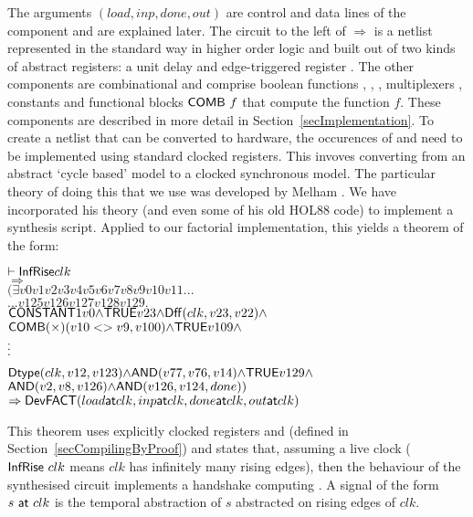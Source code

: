 \vspace*{-2mm}

The arguments $(load,inp,done,out)$ are control and data lines of the component
and are explained later. The circuit to the left of $\Rightarrow$ is a netlist represented in
the standard way in higher order logic \cite{Mel93} and built out of
two kinds of abstract registers: a unit delay  and
edge-triggered register . The other components are
combinational and comprise boolean functions ,
, , multiplexers , constants
and functional blocks
$\mathsf{COMB}~f$ that compute the function $f$. These components are
described in more detail in Section~\ref{secImplementation}. To
create a netlist that can be converted to hardware, the occurences of
 and  need to be implemented using standard
clocked registers. This invoves converting from an abstract `cycle
based' model to a clocked synchronous model. The particular theory of doing this that we use
was developed by Melham \cite{Mel93}. We have incorporated
his theory (and even some of his old HOL88 code) to
implement a synthesis script. Applied to our factorial implementation, this yields
a theorem of the form:

\vspace*{-1mm}

{\baselineskip10pt\begin{alltt}
\( \vdash \DEF{InfRise} clk                                                                        \)
\(   \Rightarrow                                                                                   \)
\(   ({\exists}v0 v1 v2 v3 v4 v5 v6 v7 v8 v9 v10 v11 ...                               \)
\(     ... v125 v126 v127 v128 v129.                                                                   \)
\(     \DEF{CONSTANT} 1 v0 {\wedge} \DEF{TRUE} v23 {\wedge} \DEF{Dff}(clk,v23,v22) {\wedge}        \)
\(     \DEF{COMB}({\times}) (v10<>v9,v100) {\wedge} \DEF{TRUE} v109 {\wedge}                       \)
       \(\raisebox{3mm}{\vdots}\)
\(     \DEF{Dtype}(clk,v12,v123) {\wedge} \DEF{AND}(v77,v76,v14) {\wedge} \DEF{TRUE} v129 {\wedge} \)
\(     \DEF{AND} (v2,v8,v126) {\wedge} \DEF{AND}(v126,v124,done))                                  \)
\(   \Rightarrow \DEF{Dev} \DEF{FACT} (load \DEF{at} clk, inp \DEF{at} clk, done \DEF{at} clk, out \DEF{at} clk) \)
\end{alltt}}

\vspace*{-2mm}

This theorem uses explicitly clocked registers  and
 (defined in Section~\ref{secCompilingByProof}) and states
that, assuming a live clock ($\mathsf{InfRise}~clk$ means $clk$
has infinitely many rising edges), then the behaviour of the
synthesised circuit implements a handshake computing
. A signal of the form $s~\mathsf{at}~clk$ is the temporal abstraction
of $s$ abstracted on rising edges of $clk$.

